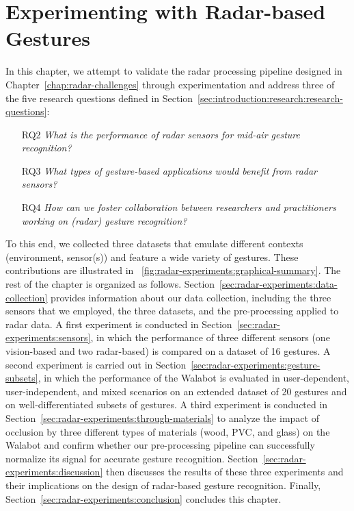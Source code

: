 \chapter{Experimenting with Radar-based Gestures}
\label{chap:radar-experiments}

In this chapter, we attempt to validate the radar processing pipeline designed in Chapter~\ref{chap:radar-challenges} through experimentation and address three of the five research questions defined in Section~\ref{sec:introduction:research:research-questions}: 
\begin{itemize}
    \item [RQ2] \textit{What is the performance of radar sensors for mid-air gesture recognition?}
    \item [RQ3] \textit{What types of gesture-based applications would benefit from radar sensors?}
    \item [RQ4] \textit{How can we foster collaboration between researchers and practitioners working on (radar) gesture recognition?}
\end{itemize}
To this end, we collected three datasets that emulate different contexts (environment, sensor(s)) and feature a wide variety of gestures. These contributions are illustrated in \fig~\ref{fig:radar-experiments:graphical-summary}. The rest of the chapter is organized as follows.
%
Section~\ref{sec:radar-experiments:data-collection} provides information about our data collection, including the three sensors that we employed, the three datasets, and the pre-processing applied to radar data.
%
A first experiment is conducted in Section~\ref{sec:radar-experiments:sensors}, in which the performance of three different sensors (one vision-based and two radar-based) is compared on a dataset of 16 gestures.
%
A second experiment is carried out in Section~\ref{sec:radar-experiments:gesture-subsets}, in which the performance of the Walabot is evaluated in user-dependent, user-independent, and mixed scenarios on an extended dataset of 20 gestures and on well-differentiated subsets of gestures.
%
A third experiment is conducted in Section~\ref{sec:radar-experiments:through-materials} to analyze the impact of occlusion by three different types of materials (wood, PVC, and glass) on the Walabot and confirm whether our pre-processing pipeline can successfully normalize its signal for accurate gesture recognition.
%
Section~\ref{sec:radar-experiments:discussion} then discusses the results of these three experiments and their implications on the design of radar-based gesture recognition.
%
Finally, Section~\ref{sec:radar-experiments:conclusion} concludes this chapter.

